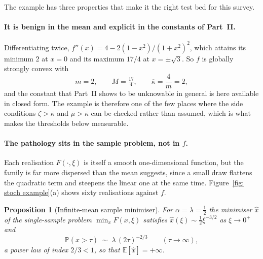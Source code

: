 \documentclass[11pt]{article}
\theoremstyle{plain}
\newtheorem{proposition}[theorem]{Proposition}
\theoremstyle{definition}
\theoremstyle{remark}
\numberwithin{equation}{section}
\providecommand{\kbar}{\overline{\kappa}}
\providecommand{\E}{\mathbb{E}}
\providecommand{\Prob}{\mathbb{P}}
\providecommand{\kbar}{\overline{\kappa}}
\begin{document}
The example has three properties that make it the right test bed for this survey.

\paragraph{It is benign in the mean and explicit in the constants of Part~II.}
Differentiating twice,
$f''(x) = 4 - 2(1-x^2)/(1+x^2)^2$, which attains its minimum $2$ at $x = 0$ and its maximum
$17/4$ at $x = \pm\sqrt{3}$. So $f$ is globally strongly convex with
\begin{equation}
  m = 2 , \qquad M = \tfrac{17}{4} , \qquad
  \kbar = \frac{4}{m} = 2 ,
  \label{eqn: stoch constants mM}
\end{equation}
and the constant that Part~II shows to be unknowable in general is here available in closed form.
The example is therefore one of the few places where the side conditions $\zeta > \kbar$ and
$\overline{\mu} > \kbar$ can be checked rather than assumed, which is what makes the thresholds
below measurable.

\paragraph{The pathology sits in the sample problem, not in $f$.}
Each realisation $F(\cdot,\xi)$ is itself a smooth one-dimensional function, but the family is far
more dispersed than the mean suggests, since a small draw flattens the quadratic term and steepens
the linear one at the same time. Figure~\ref{fig: stoch example}(a) shows sixty realisations
against $f$.

\begin{proposition}[Infinite-mean sample minimiser]
\label{prop: infinite mean}
  For $\alpha = \lambda = \tfrac12$ the minimiser $\hat x$ of the single-sample problem
  $\min_x F(x,\xi)$ satisfies $\hat x(\xi) \sim \tfrac12\xi^{-3/2}$ as $\xi \to 0^+$ and
  \begin{equation}
    \Prob(\hat x > \tau) \;\sim\; \lambda\,(2\tau)^{-2/3}
    \qquad (\tau \to \infty) ,
    \label{eqn: xhat tail}
  \end{equation}
  a power law of index $2/3 < 1$, so that $\E[\hat x] = +\infty$.
\end{proposition}
\end{document}
